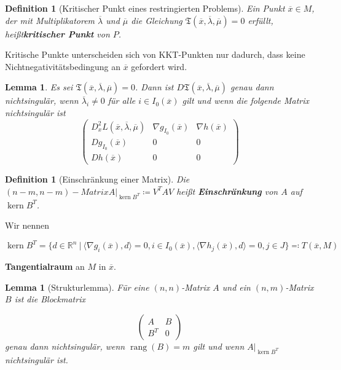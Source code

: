 \documentclass[11pt]{scrreprt}
\newcounter{thm}
\theoremstyle{thmstyle}
\numberwithin{thm}{section}
\newtheorem{definition}[thm]{Definition}
\newtheorem{lemma}[thm]{Lemma}
\begin{document}
\setcounter{thm}{54}

\begin{definition}[Kritischer Punkt eines restringierten Problems]
	Ein Punkt $\overline{x} \in M$, der mit Multiplikatorem $\overline{\lambda}$ und $\overline{\mu}$ die Gleichung $\mathfrak{T}(\overline{x}, \overline{\lambda}, \overline{\mu}) = 0$ erfüllt, heißt\textbf{kritischer Punkt} von $P$.
\end{definition}


Kritische Punkte unterscheiden sich von KKT-Punkten nur dadurch, dass keine Nichtnegativitätsbedingung an $\overline{x}$ gefordert wird.

\setcounter{thm}{56}

\begin{lemma}
	Es sei $\mathfrak{T}(\overline{x}, \overline{\lambda}, \overline{\mu}) = 0$. Dann ist $D \mathfrak{T}(\overline{x}, \overline{\lambda}, \overline{\mu})$ genau dann nichtsingulär, wenn $\overline{\lambda}_i \neq 0$ für alle $i \in I_0(\overline{x})$ gilt und wenn die folgende Matrix nichtsingulär ist
	$$ \begin{pmatrix}
		D^2_x L(\overline{x}, \overline{\lambda}, \overline{\mu}) & \nabla g_{I_0}(\overline{x}) & \nabla h(\overline{x}) \\ D g_{I_0}(\overline{x}) & 0 & 0 \\
		D h(\overline{x}) & 0 & 0
	\end{pmatrix} $$
\end{lemma}

\begin{definition}[Einschränkung einer Matrix]
	Die $(n-m, n-m)-Matrix A|_{\operatorname{kern}B^T} \coloneqq V^T A V$ heißt \textbf{Einschränkung} von $A$ auf $\operatorname{kern}B^T$.	
\end{definition}

\setcounter{thm}{59}

Wir nennen

$$ \operatorname{kern} B^T = \big\{ d \in \mathbb{R}^n ~|~ \langle \nabla g_i(\overline{x}), d \rangle = 0, i \in I_0 (\overline{x}), \langle \nabla h_j(\overline{x}), d \rangle = 0, j \in J \big\} \eqqcolon T(\overline{x}, M) $$

\textbf{Tangentialraum} an $M$ in $\overline{x}$.

\begin{lemma}[Strukturlemma]
	Für eine $(n, n)$-Matrix $A$ und ein $(n,m)$-Matrix $B$ ist die Blockmatrix
	
	$$ \begin{pmatrix}
		A & B \\ B^T & 0
	\end{pmatrix} $$	
	genau dann nichtsingulär, wenn $\operatorname{rang}(B) = m$ gilt und wenn $A|_{\operatorname{kern}B^T}$ nichtsingulär ist.
\end{lemma}
\end{document}

